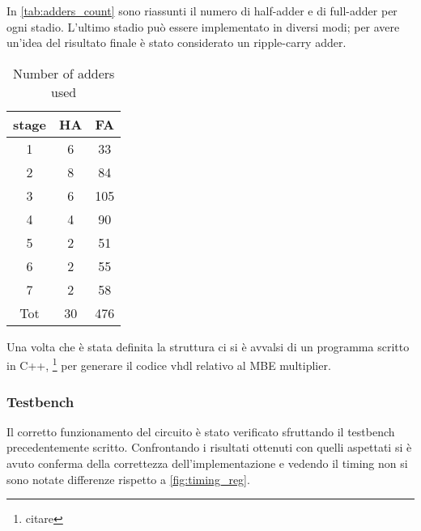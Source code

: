 In \autoref{tab:adders_count} sono riassunti il numero di half-adder e di full-adder per ogni stadio. L'ultimo stadio può essere implementato in diversi modi; per avere un'idea del risultato finale è stato considerato un ripple-carry adder.
\begin{table}[htb!]
	\centering
	\begin{tabular}{ccc}
		stage & HA & FA \\
		\hline
		1 & 6 & 33\\
		2 & 8 & 84\\
		3 & 6 & 105\\
		4 & 4 & 90\\
		5 & 2 & 51\\
		6 & 2 & 55\\
		7 & 2 & 58\\
		Tot & 30 & 476\\
	\end{tabular}
	\label{tab:adders_count}
	\caption{Number of adders used}
\end{table}
Una volta che è stata definita la struttura ci si è avvalsi di un programma scritto in C++, \footnote{citare} per generare il codice vhdl relativo al MBE multiplier.

\subsubsection{Testbench}
Il corretto funzionamento del circuito è stato verificato sfruttando il testbench precedentemente scritto. Confrontando i risultati ottenuti con quelli aspettati si è avuto conferma della correttezza dell'implementazione e vedendo il timing non si sono notate differenze rispetto a \autoref{fig:timing_reg}.
